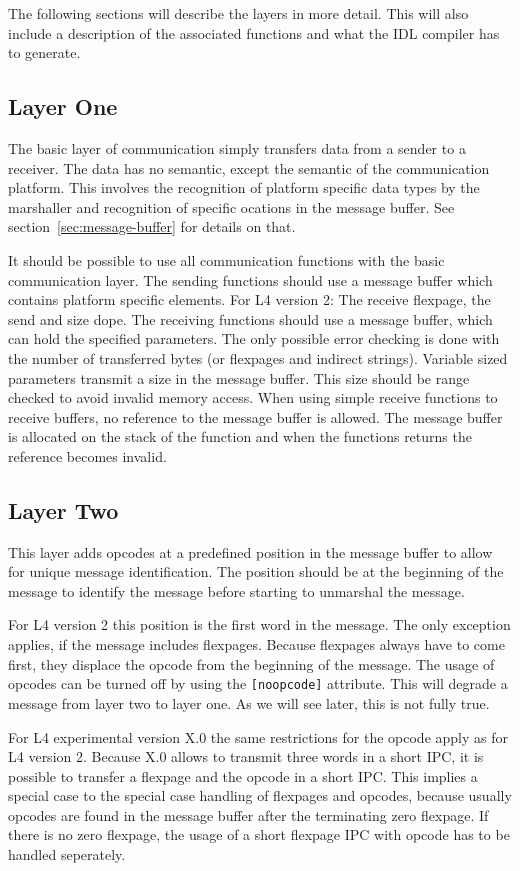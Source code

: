 The following sections will describe the layers in more detail.  This will also
include a description of the associated functions and what the IDL compiler has
to generate.

\subsection{Layer One}
The basic layer of communication simply transfers data from a sender to a 
receiver.  The data has no semantic, except the semantic of the communication
platform.  This involves the recognition of platform specific data types by the
marshaller and recognition of specific ocations in the message buffer.  See
section~\ref{sec:message-buffer} for details on that.

It should be possible to use all communication functions with the basic 
communication layer.  The sending functions should use a message buffer which
contains platform specific elements.  For L4 version 2: The receive flexpage,
the send and size dope.  The receiving functions should use a message buffer,
which can hold the specified parameters.  The only possible error checking
is done with the number of transferred bytes (or flexpages and indirect strings).
Variable sized parameters transmit a size in the message buffer.  This size
should be range checked to avoid invalid memory access.  When using simple
receive functions to receive buffers, no reference to the message buffer is
allowed.  The message buffer is allocated on the stack of the function and
when the functions returns the reference becomes invalid.

\subsection{Layer Two}
This layer adds opcodes at a predefined position in the message buffer to
allow for unique message identification.  The position should be at the 
beginning of the message to identify the message before starting to unmarshal
the message.

For L4 version 2 this position is the first word in the message.  The only
exception applies, if the message includes flexpages.  Because flexpages
always have to come first, they displace the opcode from the beginning of
the message.  The usage of opcodes can be turned off by using the 
\verb|[noopcode]| attribute.  This will degrade a message from layer two
to layer one.  As we will see later, this is not fully true.

For L4 experimental version X.0 the same restrictions for the opcode apply
as for L4 version 2.  Because X.0 allows to transmit three words in a
short IPC, it is possible to transfer a flexpage and the opcode in a short
IPC.  This implies a special case to the special case handling of flexpages
and opcodes,  because usually opcodes are found in the message buffer after
the terminating zero flexpage.  If there is no zero flexpage, the usage of
a short flexpage IPC with opcode has to be handled seperately.

